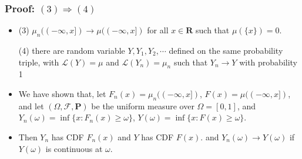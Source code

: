 \documentclass[handout]{beamer}
\newcommand{\BP}{\mathbf{P}}
\begin{document}
\frame
{
  \frametitle{Proof: $(3) \Rightarrow (4)$ } 

   \begin{itemize}

\item<1->
               


              (3) $\mu_n((-\infty, x])\rightarrow \mu((-\infty, x])$ for all $x\in \mathbf{R}$ such that $\mu(\{x\})=0$.
                                            \vspace{2mm}

              {\color{blue}  (4) there are random variable $Y, Y_1, Y_2, \cdots$ defined on the same probability triple, with $\mathcal{L} (Y)=\mu$ and $\mathcal{L} (Y_n)=\mu_n $ such that $Y_n\rightarrow Y$ with probability 1 }
                                                           \vspace{2mm}

               
                     \item<2->  We have shown that, let $F_n(x)=\mu_n((-\infty, x])$, $F(x)=\mu((-\infty, x])$, and let $(\Omega, \mathcal{F}, \BP)$ be the uniform measure over $\Omega=[0,1]$, and $Y_n(\omega)=\inf \{x: F_n(x) \geq \omega\}$, $Y(\omega)=\inf \{x: F(x) \geq \omega\}$. 
                     
                     \item<3->[-] Then $Y_n$ has CDF $F_n(x)$ and $Y$ has CDF $F(x)$.  and  $Y_n(\omega)\rightarrow Y(\omega)$ if $Y(\omega)$ is continuous at $\omega$. 

                                         
                                               \end{itemize}
}
\end{document}
